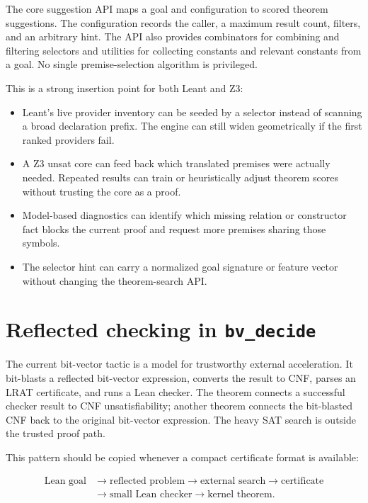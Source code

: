 \documentclass[11pt,letterpaper,openany]{report}
\newcommand{\code}[1]{\texttt{\detokenize{#1}}}
\begin{document}
The core suggestion API maps a goal and configuration to scored theorem suggestions.
The configuration records the caller, a maximum result count, filters, and an
arbitrary hint. The API also provides combinators for combining and filtering
selectors and utilities for collecting constants and relevant constants from a goal.
No single premise-selection algorithm is privileged.

This is a strong insertion point for both Leant and Z3:

\begin{itemize}
  \item Leant's live provider inventory can be seeded by a selector instead of scanning
        a broad declaration prefix. The engine can still widen geometrically if the
        first ranked providers fail.
  \item A Z3 unsat core can feed back which translated premises were actually needed.
        Repeated results can train or heuristically adjust theorem scores without
        trusting the core as a proof.
  \item Model-based diagnostics can identify which missing relation or constructor
        fact blocks the current proof and request more premises sharing those symbols.
  \item The selector hint can carry a normalized goal signature or feature vector
        without changing the theorem-search API.
\end{itemize}

\section{Reflected checking in \texttt{bv\_decide}}

The current bit-vector tactic is a model for trustworthy external acceleration. It
bit-blasts a reflected bit-vector expression, converts the result to CNF, parses an
LRAT certificate, and runs a Lean checker. The theorem
\code{verifyCert_correct} connects a successful checker result to CNF
unsatisfiability; another theorem connects the bit-blasted CNF back to the original
bit-vector expression. The heavy SAT search is outside the trusted proof path.

This pattern should be copied whenever a compact certificate format is available:

\[
\begin{aligned}
\text{Lean goal}
  &\longrightarrow \text{reflected problem}
   \longrightarrow \text{external search}
   \longrightarrow \text{certificate} \\
  &\longrightarrow \text{small Lean checker}
   \longrightarrow \text{kernel theorem}.
\end{aligned}
\]
\end{document}
